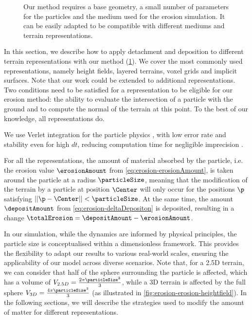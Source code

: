 \begin{figure}
    \caption[\cref{chap:erosion}'s pipeline]{Our method requires a base geometry, a small number of parameters for the particles and the medium used for the erosion simulation. It can be easily adapted to be compatible with different mediums and terrain representations.}
    \label{fig:erosion-pipeline}
\end{figure}

In this section, we describe how to apply detachment and deposition to different terrain representations with our method (\cref{fig:erosion-pipeline}). We cover the most commonly used representations, namely height fields, layered terrains, voxel grids and implicit surfaces. Note that our work could be extended to additional representations. Two conditions need to be satisfied for a representation to be eligible for our erosion method: the ability to evaluate the intersection of a particle with the ground and to compute the normal of the terrain at this point. To the best of our knowledge, all representations do.

We use Verlet integration for the particle physics \cite{Verlet1967}, with low error rate and stability even for high $dt$, reducing computation time for negligible imprecision \cite{Baraff1998, Swope1982}.

For all the representations, the amount of material absorbed by the particle, i.e. the erosion value $\erosionAmount$ from \eqref{eq:erosion-erosionAmount}, is taken around the particle at a radius $\particleSize$, meaning that the modification of the terrain by a particle at position $\Center$ will only occur for the positions $\p$ satisfying $||\p - \Center|| < \particleSize$. At the same time, the amount $\depositAmount$ from \eqref{eq:erosion-deltaDepositon} is deposited, resulting in a change $\totalErosion = \depositAmount - \erosionAmount$.

In our simulation, while the dynamics are informed by physical principles, the particle size is conceptualised within a dimensionless framework. This provides the flexibility to adapt our results to various real-world scales, ensuring the applicability of our model across diverse scenarios.  
Note that, for a 2.5D terrain, we can consider that half of the sphere surrounding the particle is affected, which has a volume of $V_{2.5D} = \frac{2 \pi \particleSize^3}{3}$, while a 3D terrain is affected by the full sphere $V_{3D} = \frac{4 \pi \particleSize^3}{3}$ (as illustrated in \cref{fig:erosion-erosion-heightfield}). In the following sections, we will describe the strategies used to modify the amount of matter for different representations. 

